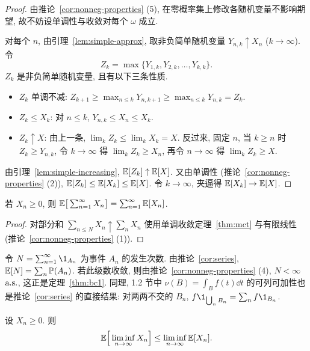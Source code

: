 \begin{proof}
由推论~\ref{cor:nonneg-properties} (5), 在零概率集上修改各随机变量不影响期望, 故不妨设单调性与收敛对每个 $\omega$ 成立.

对每个 $n$, 由引理~\ref{lem:simple-approx}, 取非负简单随机变量 $Y_{n,k}\uparrow X_n$ ($k\to\infty$). 令
\[
Z_k=\max\{Y_{1,k},Y_{2,k},\dots,Y_{k,k}\}.
\]
$Z_k$ 是非负简单随机变量, 且有以下三条性质.
\begin{itemize}
\item $Z_k$ 单调不减: $Z_{k+1}\ge\max_{n\le k}Y_{n,k+1}\ge\max_{n\le k}Y_{n,k}=Z_k$.
\item $Z_k\le X_k$: 对 $n\le k$, $Y_{n,k}\le X_n\le X_k$.
\item $Z_k\uparrow X$: 由上一条, $\lim_k Z_k\le\lim_k X_k=X$. 反过来, 固定 $n$, 当 $k\ge n$ 时 $Z_k\ge Y_{n,k}$, 令 $k\to\infty$ 得 $\lim_k Z_k\ge X_n$, 再令 $n\to\infty$ 得 $\lim_k Z_k\ge X$.
\end{itemize}
由引理~\ref{lem:simple-increasing}, $\mathbb{E}[Z_k]\uparrow\mathbb{E}[X]$. 又由单调性 (推论~\ref{cor:nonneg-properties} (2)), $\mathbb{E}[Z_k]\le\mathbb{E}[X_k]\le\mathbb{E}[X]$. 令 $k\to\infty$, 夹逼得 $\mathbb{E}[X_k]\to\mathbb{E}[X]$.
\end{proof}

\begin{corollary}[逐项求期望]\label{cor:series}
若 $X_n\ge0$, 则 $\mathbb{E}\big[\sum_{n=1}^\infty X_n\big]=\sum_{n=1}^\infty\mathbb{E}[X_n]$.
\end{corollary}

\begin{proof}
对部分和 $\sum_{n\le N}X_n\uparrow\sum_{n}X_n$ 使用单调收敛定理~\ref{thm:mct} 与有限线性 (推论~\ref{cor:nonneg-properties} (1)).
\end{proof}

\begin{example}
令 $N=\sum_{n=1}^\infty\1_{A_n}$ 为事件 $A_n$ 的发生次数. 由推论~\ref{cor:series}, $\mathbb{E}[N]=\sum_n\mathbb{P}(A_n)$. 若此级数收敛, 则由推论~\ref{cor:nonneg-properties} (4), $N<\infty$ $\text{a.s.}$, 这正是定理~\ref{thm:bc1}. 同理, 1.2 节中 $\nu(B)=\int_B f(t)\dd t$ 的可列可加性也是推论~\ref{cor:series} 的直接结果: 对两两不交的 $B_n$, $f\1_{\bigcup_n B_n}=\sum_n f\1_{B_n}$.
\end{example}

\begin{theorem}[Fatou 引理]\label{thm:fatou}
设 $X_n\ge0$. 则
\[
\mathbb{E}\Big[\liminf_{n\to\infty}X_n\Big]\le\liminf_{n\to\infty}\mathbb{E}[X_n].
\]
\end{theorem}

